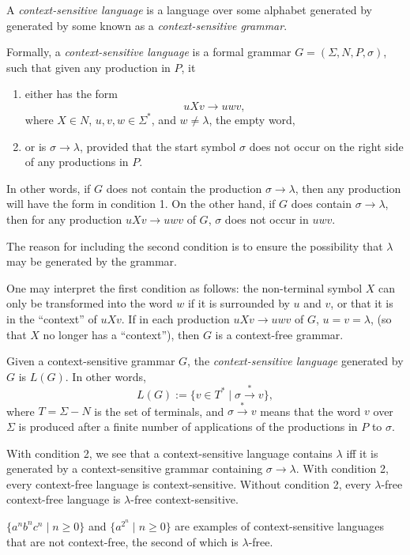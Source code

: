 \documentclass[12pt]{article}
\begin{document}
A \emph{context-sensitive language} is a language over some alphabet generated by generated by some  known as a \emph{context-sensitive grammar}.

Formally, a \emph{context-sensitive language} is a formal grammar $G=(\Sigma, N, P, \sigma)$, such that given any production in $P$, it
\begin{enumerate}
\item either has the form $$uXv\to uwv,$$ where $X\in N$, $u,v,w\in \Sigma^*$, and $w\ne \lambda$, the empty word,
\item or is $\sigma\to \lambda$, provided that the start symbol $\sigma$ does not occur on the right side of any productions in $P$. 
\end{enumerate}
In other words, if $G$ does not contain the production $\sigma\to \lambda$, then any production will have the form in condition 1.  On the other hand, if $G$ does contain $\sigma\to \lambda$, then for any production $uXv\to uwv$ of $G$, $\sigma$ does not occur in $uwv$.  

The reason for including the second condition is to ensure the possibility that $\lambda$ may be generated by the grammar.

One may interpret the first condition as follows: the non-terminal symbol $X$ can only be transformed into the word $w$ if it is surrounded by $u$ and $v$, or that it is in the ``context'' of $uXv$.  If in each production $uXv\to uwv$ of $G$, $u=v=\lambda$, (so that $X$ no longer has a ``context''), then $G$ is a context-free grammar.

Given a context-sensitive grammar $G$, the \emph{context-sensitive language} generated by $G$ is $L(G)$.  In other words, $$L(G):=\lbrace v\in T^*\mid \sigma\stackrel{*}{\to} v\rbrace,$$
where $T=\Sigma-N$ is the set of terminals, and $\sigma\stackrel{*}{\to} v$ means that the word $v$ over $\Sigma$ is produced after a finite number of applications of the productions in $P$ to $\sigma$.  

With condition 2, we see that a context-sensitive language contains $\lambda$ iff it is generated by a context-sensitive grammar containing $\sigma\to \lambda$.  With condition 2, every context-free language is context-sensitive.  Without condition 2, every $\lambda$-free context-free language is $\lambda$-free context-sensitive.  

$\lbrace a^nb^nc^n \mid n\ge 0\rbrace$ and $\lbrace a^{2^n} \mid n\ge 0 \rbrace$ are examples of context-sensitive languages that are not context-free, the second of which is $\lambda$-free.
\end{document}
